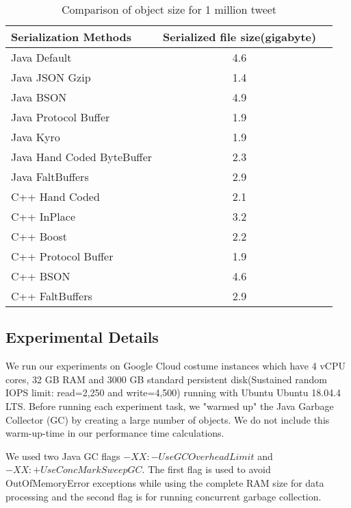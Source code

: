 \begin{table}
	\centering
	\caption{Comparison of object size for 1 million tweet }
	\label{tbl:object_size}
	\begin{adjustbox}{width=\columnwidth,center}	
		
		\begin{tabular}{|l|c|c|} \hline
		 \textbf{Serialization Methods} & \textbf{Serialized file size(gigabyte)}\\ \hline
			Java Default  & 4.6 \\ \hline	
			Java JSON Gzip  & 1.4 \\ \hline	
			Java BSON  & 4.9 \\ \hline	
			Java Protocol Buffer  & 1.9 \\ \hline	
			Java Kyro  & 1.9 \\ \hline	
			Java Hand Coded ByteBuffer  & 2.3 \\ \hline	
			Java FaltBuffers  & 2.9 \\ \hline	
			C++ Hand Coded  & 2.1 \\ \hline	
			C++ InPlace  & 3.2 \\ \hline	
			C++ Boost  & 2.2 \\ \hline	
			C++ Protocol Buffer  & 1.9 \\ \hline
			C++ BSON  & 4.6 \\ \hline	
			C++ FaltBuffers  & 2.9 \\ \hline				
			\hline\end{tabular}
	\end{adjustbox}
\end{table}


\subsection{Experimental Details}
We run our experiments on Google Cloud costume instances which have 4 vCPU cores, 32 GB RAM and 3000 GB standard persistent disk(Sustained random IOPS limit: read=2,250 and write=4,500) running with Ubuntu Ubuntu 18.04.4 LTS. Before running each experiment task, we "warmed up" the Java Garbage Collector (GC) by creating a large number of objects. We do not include this warm-up-time in our performance time calculations.

We used two Java GC flags $-XX:-UseGCOverheadLimit$ and $-XX:+UseConcMarkSweepGC$. The first flag is used to avoid OutOfMemoryError exceptions while using the complete RAM size for data processing and the second flag is for running concurrent garbage collection.

